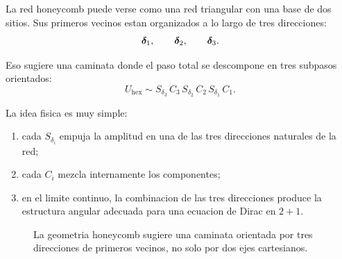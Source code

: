 La red honeycomb puede verse como una red triangular con una base de dos sitios. Sus primeros vecinos estan organizados a lo largo de tres direcciones:
\begin{equation}
\bm{\delta}_1,\qquad \bm{\delta}_2,\qquad \bm{\delta}_3.
\end{equation}

Eso sugiere una caminata donde el paso total se descompone en tres subpasos orientados:
\begin{equation}
U_{\mathrm{hex}}\sim S_{\delta_3}\,C_3\,S_{\delta_2}\,C_2\,S_{\delta_1}\,C_1.
\label{c04:eq:uhexa}
\end{equation}

La idea fisica es muy simple:

\begin{enumerate}[leftmargin=*]
  \item cada \(S_{\delta_i}\) empuja la amplitud en una de las tres direcciones naturales de la red;
  \item cada \(C_i\) mezcla internamente los componentes;
  \item en el limite continuo, la combinacion de las tres direcciones produce la estructura angular adecuada para una ecuacion de Dirac en \(2+1\).
\end{enumerate}

\begin{figure}[ht]
\centering
{}
\caption{La geometria honeycomb sugiere una caminata orientada por tres direcciones de primeros vecinos, no solo por dos ejes cartesianos.}
\label{c04:fig:honeycomb-directions}
\end{figure}


